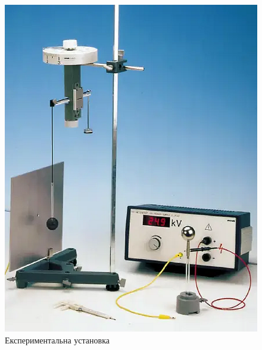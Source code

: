 \documentclass{LabWork}
\begin{document}
\begin{figure}[ht!]
\begin{minipage}[t]{0.45\linewidth}
			\includegraphics[width=1\linewidth]{Installation}
			\caption{Експериментальна установка}
			\label{pic:Installation}
	\end{minipage}
\end{figure}
\end{document}
